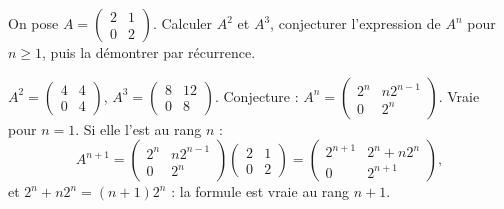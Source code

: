 \begin{exercise}
On pose $A=\begin{pmatrix}2&1\\0&2\end{pmatrix}$. Calculer $A^2$ et $A^3$, conjecturer l'expression de $A^n$ pour $n\ge1$, puis la démontrer par récurrence.
\end{exercise}
\begin{solution}
$A^2=\begin{pmatrix}4&4\\0&4\end{pmatrix}$, $A^3=\begin{pmatrix}8&12\\0&8\end{pmatrix}$. Conjecture : $A^n=\begin{pmatrix}2^n&n2^{n-1}\\0&2^n\end{pmatrix}$. Vraie pour $n=1$. Si elle l'est au rang $n$ :
\[A^{n+1}=\begin{pmatrix}2^n&n2^{n-1}\\0&2^n\end{pmatrix}\begin{pmatrix}2&1\\0&2\end{pmatrix}=\begin{pmatrix}2^{n+1}&2^n+n2^n\\0&2^{n+1}\end{pmatrix},\]
et $2^n+n2^n=(n+1)2^n$ : la formule est vraie au rang $n+1$.
\end{solution}

